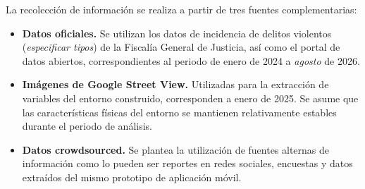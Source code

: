 
La recolección de información se realiza a partir de tres fuentes complementarias:

\begin{itemize}
    \item \textbf{Datos oficiales.} Se utilizan los datos de incidencia de delitos violentos (\textit{especificar tipos}) de la Fiscalía General de Justicia, así como el portal de datos abiertos, correspondientes al periodo de enero de 2024 a \textit{agosto} de 2026.
    \item \textbf{Imágenes de Google Street View.} Utilizadas para la extracción de variables del entorno construido, corresponden a enero de 2025. Se asume que las características físicas del entorno se mantienen relativamente estables durante el periodo de análisis.
    \item \textbf{Datos crowdsourced.} Se plantea la utilización de fuentes alternas de información como lo pueden ser reportes en redes sociales, encuestas y datos extraídos del mismo prototipo de aplicación móvil.
\end{itemize}
